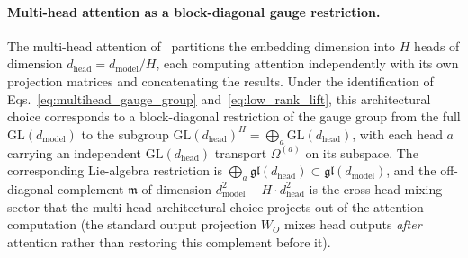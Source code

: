 \documentclass[11pt]{article}
\begin{document}
\paragraph{Multi-head attention as a block-diagonal gauge restriction.}
The multi-head attention of~\cite{vaswani2017attention} partitions the embedding dimension into $H$ heads of dimension $d_{\text{head}} = d_{\text{model}}/H$, each computing attention independently with its own projection matrices and concatenating the results. Under the identification of Eqs.~\eqref{eq:multihead_gauge_group} and~\eqref{eq:low_rank_lift}, this architectural choice corresponds to a block-diagonal restriction of the gauge group from the full $\mathrm{GL}(d_{\text{model}})$ to the subgroup $\mathrm{GL}(d_{\text{head}})^H = \bigoplus_a \mathrm{GL}(d_{\text{head}})$, with each head $a$ carrying an independent $\mathrm{GL}(d_{\text{head}})$ transport $\Omega^{(a)}$ on its subspace. The corresponding Lie-algebra restriction is $\bigoplus_a \mathfrak{gl}(d_{\text{head}}) \subset \mathfrak{gl}(d_{\text{model}})$, and the off-diagonal complement $\mathfrak{m}$ of dimension $d_{\text{model}}^2 - H \cdot d_{\text{head}}^2$ is the cross-head mixing sector that the multi-head architectural choice projects out of the attention computation (the standard output projection $W_O$ mixes head outputs \emph{after} attention rather than restoring this complement before it).
\end{document}
